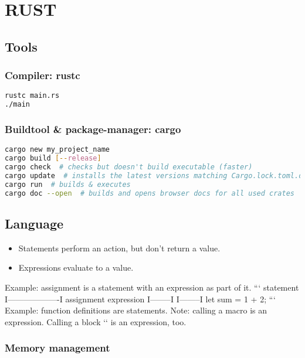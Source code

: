 \section{RUST}

\subsection{Tools}

\subsubsection{Compiler: rustc}
\begin{lstlisting}[language=sh]
rustc main.rs
./main
\end{lstlisting}

\subsubsection{Buildtool \& package-manager: cargo}
\begin{lstlisting}[language=sh]
cargo new my_project_name
cargo build [--release]
cargo check  # checks but doesn't build executable (faster)
cargo update  # installs the latest versions matching Cargo.lock.toml.dependencies. updates Cargo.lock
cargo run  # builds & executes
cargo doc --open  # builds and opens browser docs for all used crates
\end{lstlisting}

\subsection{Language}

\begin{itemize}
    \item Statements perform an action, but don't return a value.
    \item Expressions evaluate to a value.
\end{itemize}

Example: assignment is a statement with an expression as part of it.
```
     statement
I-------------------I
assignment expression
I--------I I--------I
let sum  = 1 + 2;
```
Example: function definitions are statements.
Note: calling a macro is an expression. Calling a block `{}` is an expression, too.


\subsubsection{Memory management}

